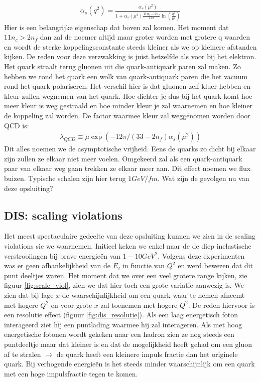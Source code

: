 \documentclass[../main.tex]{subfiles}
\begin{document}
\begin{equation}
    \begin{aligned}
        \label{eq:running_strong}
        \alpha_s(q^2) = \frac{\alpha_s(\mu^2)}{1+\alpha_s(\mu^2) \frac{11n_c-2n_f}{12\pi} \ln\left(\frac{q^2}{\mu^2}\right)} 
    \end{aligned}
\end{equation}
 Hier is een belangrijke eigenschap dat boven zal komen. Het moment dat $11n_c>2n_f$ dan zal de noemer altijd maar groter worden met grotere q waarden en wordt de sterke koppelingsconstante steeds kleiner als we op kleinere afstanden kijken. De reden voor deze verzwakking is juist hetzelfde als voor bij het elektron. Het quark straalt terug gluonen uit die quark-antiquark paren zal maken. Zo hebben we rond het quark een wolk van quark-antiquark paren die het vacuum rond het quark polariseren. Het verschil hier is dat gluonen zelf kluer hebben en kleur zullen wegnemen van het quark. Hoe dichter je dus bij het quark komt hoe meer kleur is weg gestraald en hoe minder kleur je zal waarnemen en hoe kleiner de koppeling zal worden. De factor waarmee kleur zal weggenomen worden door QCD is:
\begin{equation}
    \begin{aligned}
        \label{eq:kleur_qcd}
        \lambda_{QCD} \equiv \mu \exp(-12\pi/(33-2n_f)\alpha_s(\mu^2))
    \end{aligned}
\end{equation}
Dit alles noemen we de asymptotische vrijheid. Eens de quarks zo dicht bij elkaar zijn zullen ze elkaar niet meer voelen. Omgekeerd zal als een quark-antiquark paar van elkaar weg gaan trekken ze elkaar meer aan. Dit effect noemen we flux buizen. Typische schalen zijn hier terug $1GeV/fm$. Wat zijn de gevolgen nu van deze opsluiting?

\subsection{DIS: scaling violations}%
\label{sub:dis_scaling_violations}

Het meest spectaculaire gedeelte van deze opsluiting kunnen we zien in de scaling violations sie we waarnemen. Initieel keken we enkel naar de de diep inelastische verstrooiingen bij brave energieën van $1-10GeV^2$. Volgens deze experimenten was er geen afhankelijkheid van de $F_2$ in functie van $Q^2$ en werd bewezen dat dit punt deeltjes waren. Het moment dat we over een veel grotere range kijken, zie figuur \ref{fig:scale_viol}, zien we dat hier toch een grote variatie aanwezig is. We zien dat bij lage $x$ de waarschijnlijkheid om een quark waar te nemen afneemt met hogere $Q^2$ en voor grote $x$ zal toenemen met hogere $Q^2$. De reden hiervoor is een resolutie effect (figuur \ref{fig:dis_resolutie}). Als een laag energetisch foton interageerd ziet hij een puntlading waarmee hij zal interageren. Als met hoog energetische fotonen wordt gekeken naar een hadron zien ze nog steeds een puntdeeltje maar dat kleiner is en dat de mogelijkheid heeft gehad om een gluon af te stralen $\rightarrow$ de quark heeft een kleinere impuls fractie dan het originele quark. Bij verhogende energieën is het steeds minder waarschijnlijk om een quark met een hoge impulsfractie tegen te komen.
\end{document}
